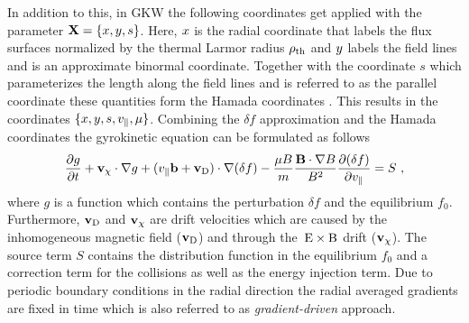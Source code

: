 In addition to this, in GKW the following coordinates get applied with the parameter $\boldsymbol{\mathbf{X}} = \{x, y, s\}$. Here, $x$ is the radial coordinate that labels the flux surfaces normalized by the thermal Larmor radius $\rho_{\mathrm{th}}$ and $y$ labels the field lines and is an approximate binormal coordinate. Together with the coordinate $s$ which parameterizes the length along the field lines and is referred to as the parallel coordinate these quantities form the Hamada coordinates \cite{Hamada1958}. This results in the coordinates $\{x, y, s, v_\parallel, \mu\}$. Combining the $\delta f$ approximation and the Hamada coordinates the gyrokinetic equation can be formulated as follows
\begin{gather}
	\frac{\partial g}{\partial t} + \boldsymbol{\mathbf{v}}_\chi \cdot \nabla g + (v_\parallel \boldsymbol{\mathbf{b}} + \boldsymbol{\mathbf{v}}_\mathrm{D}) \cdot \nabla(\delta f) - \frac{\mu B}{m}\frac{\boldsymbol{\mathbf{B}}\cdot\nabla B}{B^2}\frac{\partial (\delta f)}{\partial v_\parallel} = S~,
\end{gather}
where $g$ is a function which contains the perturbation $\delta f$ and the equilibrium $f_0$. Furthermore, $\boldsymbol{\mathbf{v}}_\mathrm{D}$ and $\boldsymbol{\mathbf{v}}_\chi$ are drift velocities which are caused by the inhomogeneous magnetic field ($\boldsymbol{\mathbf{v}}_\mathrm{D}$) and through the $\mathrm{\:E}\times\mathrm{B}$ drift ($\boldsymbol{\mathbf{v}}_\chi$). The source term $S$ contains the distribution function in the equilibrium $f_0$ and a correction term for the collisions as well as the energy injection term. Due to periodic boundary conditions in the radial direction the radial averaged gradients are fixed in time which is also referred to as \textit{gradient-driven} approach. \cite{Peeters2009}